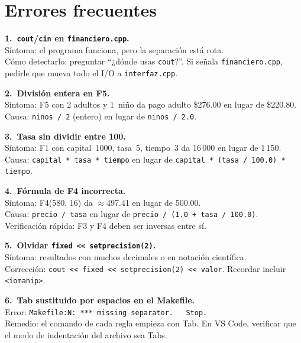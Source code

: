 \documentclass[12pt, oneside]{article}
\begin{document}
\section{Errores frecuentes}

\begin{notaprofesor}

  \textbf{1.\ \texttt{cout}/\texttt{cin} en \texttt{financiero.cpp}.}\\
  Síntoma: el programa funciona, pero la separación está rota.\\
  Cómo detectarlo: preguntar ``¿dónde usas \texttt{cout}?''.
  Si señala \texttt{financiero.cpp}, pedirle que mueva todo
  el I/O a \texttt{interfaz.cpp}.

  \vspace{0.4em}
  \textbf{2.\ División entera en F5.}\\
  Síntoma: F5 con 2 adultos y 1~niño da pago adulto \$276.00
  en lugar de \$220.80.\\
  Causa: \texttt{ninos / 2} (entero) en lugar de \texttt{ninos / 2.0}.

  \vspace{0.4em}
  \textbf{3.\ Tasa sin dividir entre 100.}\\
  Síntoma: F1 con capital~1000, tasa~5, tiempo~3 da 16\,000
  en lugar de 1\,150.\\
  Causa: \texttt{capital * tasa * tiempo} en lugar de
  \texttt{capital * (tasa / 100.0) * tiempo}.

  \vspace{0.4em}
  \textbf{4.\ Fórmula de F4 incorrecta.}\\
  Síntoma: F4(580, 16) da $\approx$497.41 en lugar de 500.00.\\
  Causa: \texttt{precio / tasa} en lugar de
  \texttt{precio / (1.0 + tasa / 100.0)}.\\
  Verificación rápida: F3 y F4 deben ser inversas entre sí.

  \vspace{0.4em}
  \textbf{5.\ Olvidar \texttt{fixed << setprecision(2)}.}\\
  Síntoma: resultados con muchos decimales o en notación científica.\\
  Corrección: \texttt{cout << fixed << setprecision(2) << valor}.
  Recordar incluir \texttt{<iomanip>}.

  \vspace{0.4em}
  \textbf{6.\ Tab sustituido por espacios en el Makefile.}\\
  Error: \texttt{Makefile:N: *** missing separator.~~ Stop.}\\
  Remedio: el comando de cada regla empieza con Tab.  En VS Code,
  verificar que el modo de indentación del archivo sea Tabs.


\end{notaprofesor}
\end{document}
